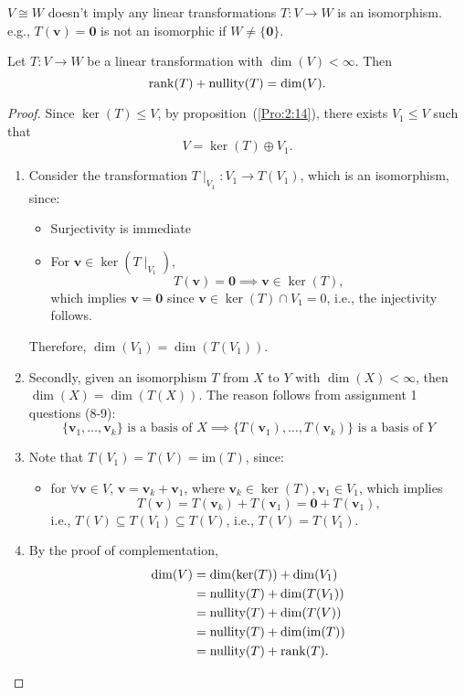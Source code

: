 \begin{remark}
$V\cong W$ doesn't imply any linear transformations $T:V\to W$ is an isomorphism. e.g., 
$T(\bm v)=\bm0$ is not an isomorphic if $W\ne\{\bm0\}$.
\end{remark}

\begin{theorem}\label{The:2:3}
Let $T:V\to W$ be a linear transformation with $\dim(V)<\infty$. Then
\[
\operatorname{rank}(T)+\text{nullity}(T)=\dim(V).
\]
\end{theorem}

\begin{proof}
Since $\ker(T)\le V$, by proposition~(\ref{Pro:2:14}), there exists  $V_1\le V$ such that 
\[
V=\ker(T)\oplus V_1.
\]
\begin{enumerate}
\item
Consider the transformation $T\mid_{V_1}:V_1\to T(V_1)$, which is an isomorphism, since:
\begin{itemize}
\item
Surjectivity is immediate
\item
For $\bm v\in\ker(T\mid_{V_1})$,
\[
T(\bm v)=\bm0\implies \bm v\in\ker(T),
\]
which implies $\bm v=\bm0$ since $\bm v\in\ker(T)\cap V_1=0$, i.e., the injectivity follows.
\end{itemize}
Therefore, $\dim(V_1)=\dim(T(V_1))$.
\item
Secondly, given an isomorphism $T$ from $X$ to $Y$ with $\dim(X)<\infty$, then $\dim(X)=\dim(T(X))$. The reason follows from assignment 1 questions (8-9):
\[
\{\bm v_1,\dots,\bm v_k\}\text{ is a basis of $X$}\implies
\{T(\bm v_1),\dots,T(\bm v_k)\}\text{ is a basis of $Y$}
\]
\item
Note that $T(V_1)=T(V)=\text{im}(T)$, since:
\begin{itemize}
\item
for $\forall\bm v\in V$, $\bm v=\bm v_k+\bm v_1$, where $\bm v_k\in\ker(T),\bm v_1\in V_1$, which implies
\[
T(\bm v)=T(\bm v_k)+T(\bm v_1)=\bm0+T(\bm v_1),
\]
i.e., $T(V)\subseteq T(V_1)\subseteq T(V)$, i.e., $T(V)=T(V_1)$.
\end{itemize}
\item
By the proof of complementation, 
\begin{align*}
\dim(V)&=\dim(\ker(T))+\dim(V_1)\\
&=\text{nullity}(T)+\dim(T(V_1))\\
&=\text{nullity}(T)+\dim(T(V))\\
&=\text{nullity}(T)+\dim(\text{im}(T))\\
&=\text{nullity}(T)+\operatorname{rank}(T).
\end{align*}
\end{enumerate}
\end{proof}













